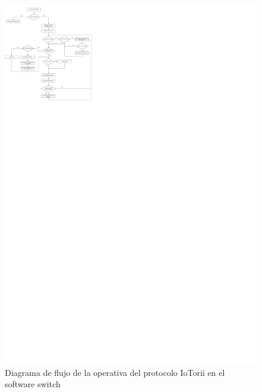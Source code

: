 \begin{figure}[ht!]
    \centering
    \includegraphics[width=\textwidth]{archivos/img/dev/iotorii.pdf}
    \caption{Diagrama de flujo de la operativa del protocolo IoTorii en el software switch }
    \label{fig:iotoriiFulls}
\end{figure}

\newpage

